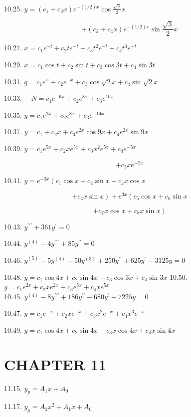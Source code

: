 \documentclass[10pt]{article}
\begin{document}
10.25. $y=\left(c_{1}+c_{3} x\right) e^{-(1 / 2) x} \cos \frac{\sqrt{3}}{2} x$

$$
+\left(c_{2}+c_{4} x\right) e^{-(1 / 2) x} \sin \frac{\sqrt{3}}{2} x
$$

10.27. $x=c_{1} e^{-t}+c_{2} t e^{-t}+c_{3} t^{2} e^{-t}+c_{4} t^{3} e^{-t}$

10.29. $x=c_{1} \cos t+c_{2} \sin t+c_{3} \cos 3 t+c_{4} \sin 3 t$

10.31. $q=c_{1} e^{x}+c_{2} e^{-x}+c_{3} \cos \sqrt{2} x+c_{4} \sin \sqrt{2} x$

10.33. $\quad N=c_{1} e^{-6 x}+c_{2} e^{8 x}+c_{3} e^{10 x}$

10.35. $y=c_{1} e^{2 x}+c_{2} e^{8 x}+c_{3} e^{-14 x}$

10.37. $y=c_{1}+c_{2} x+c_{3} e^{2 x} \cos 9 x+c_{4} e^{2 x} \sin 9 x$

10.39. $y=c_{1} e^{5 x}+c_{2} x e^{5 x}+c_{3} x^{2} e^{5 x}+c_{4} e^{-5 x}$

$$
+c_{5} x e^{-5 x}
$$

10.41. $y=e^{-3 x}\left(c_{1} \cos x+c_{2} \sin x+c_{3} x \cos x\right.$

$$
\left.+c_{4} x \sin x\right)+e^{3 x}\left(c_{5} \cos x+c_{6} \sin x\right.
$$

$$
\left.+c_{7} x \cos x+c_{8} x \sin x\right)
$$

10.43. $y^{\prime \prime \prime}+361 y^{\prime}=0$

10.44. $y^{(4)}-4 y^{\prime \prime \prime}+85 y^{\prime \prime}=0$

10.46. $y^{(5)}-5 y^{(4)}-50 y^{(3)}+250 y^{\prime \prime}+625 y^{\prime}-3125 y=0$

10.48. $y=c_{1} \cos 4 x+c_{2} \sin 4 x+c_{3} \cos 3 x+c_{4} \sin 3 x$ 10.50. $y=c_{1} e^{2 x}+c_{2} x e^{2 x}+c_{3} e^{5 x}+c_{4} x e^{5 x}$\\
10.45. $y^{(4)}-8 y^{\prime \prime \prime}+186 y^{\prime \prime}-680 y^{\prime}+7225 y=0$

10.47. $y=c_{1} e^{-x}+c_{2} x e^{-x}+c_{3} x^{2} e^{-x}+c_{4} x^{3} e^{-x}$

10.49. $y=c_{1} \cos 4 x+c_{2} \sin 4 x+c_{3} x \cos 4 x+c_{4} x \sin 4 x$

\section*{CHAPTER 11}
11.15. $y_{p}=A_{1} x+A_{0}$

11.17. $y_{p}=A_{2} x^{2}+A_{1} x+A_{0}$
\end{document}
